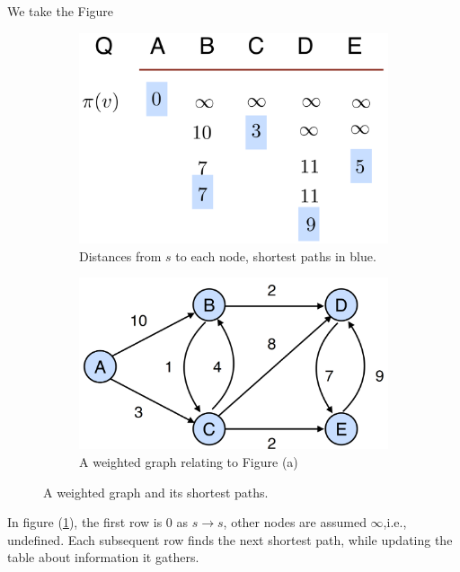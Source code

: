 \noindent
We take the Figure

\begin{figure}[h!]
    \centering
    
    \begin{subfigure}{0.35\textwidth}
        \centering
        \includegraphics[width=\linewidth]{./Sections/sched/dstra/w_dist.png}
        \caption{Distances from $s$ to each node, shortest paths in blue.}
        \label{fig:subfig1}
    \end{subfigure}
    \quad %
    
    \begin{subfigure}{0.45\textwidth}
        \centering
        \includegraphics[width=\linewidth]{./Sections/sched/dstra/w_graph.png}
        \caption{A weighted graph relating to Figure (a)}
        \label{fig:subfig2}
    \end{subfigure}
    
    \caption{A weighted graph and its shortest paths.}
    \label{fig:combined_figure}
\end{figure}
\noindent
In figure (\ref{fig:subfig1}), the first row is $0$ as $s\to s$, other nodes are assumed $\infty$,i.e., undefined. Each subsequent row finds the next shortest path, while 
updating the table about information it gathers.


